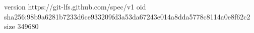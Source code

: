 version https://git-lfs.github.com/spec/v1
oid sha256:98b9a6281b7233d6ce933209fd3a53da67243e014a8dda5778c8114a0e8f62c2
size 349680
